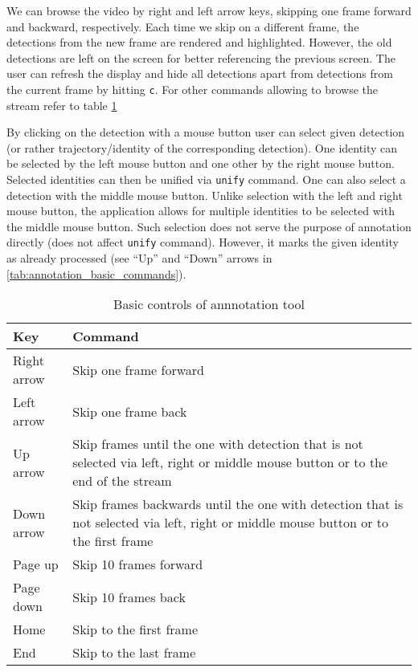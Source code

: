 We can browse the video by right and left arrow keys, skipping one frame forward and
backward, respectively. Each time we skip on a different frame, the detections from
the new frame are rendered and highlighted. However, the old detections are left
on the screen for better referencing the previous screen. The user can refresh the display
and hide all detections apart from detections from the current frame by hitting \verb+c+.
For other commands allowing to browse the stream refer to table
\ref{tab:annotation_basic_commands}

By clicking on the detection with a mouse button user can select given detection (or rather trajectory/identity of the corresponding detection). One identity can be selected
by the left mouse button and one other by the right mouse button. Selected identities can then be unified via \verb+unify+ command. One can also select a detection with the
middle mouse button. Unlike selection with the left and right mouse button, the application
allows for multiple identities to be selected with the middle mouse button. Such selection
does not serve the purpose of annotation directly (does not affect \verb+unify+ command).
However, it marks the given identity as already processed (see ``Up'' and ``Down'' arrows in \autoref{tab:annotation_basic_commands}).

\begin{table}
    \centering
    \begin{tabularx}{\textwidth}{l|X}
         \textbf{Key} & \textbf{Command} \\ \hline
         Right arrow & Skip one frame forward \\ \hline
         Left arrow & Skip one frame back \\ \hline
         Up arrow & Skip frames until the one with detection that is not selected
         via left, right or middle mouse button or to the end of the stream \\ \hline
         Down arrow & Skip frames backwards until the one with detection that is not selected via left, right or middle mouse button or to the first frame \\ \hline
         Page up & Skip 10 frames forward \\ \hline
         Page down & Skip 10 frames back \\ \hline
         Home & Skip to the first frame \\ \hline
         End & Skip to the last frame
    \end{tabularx}
    \caption{Basic controls of annnotation tool}
    \label{tab:annotation_basic_commands}
\end{table}


